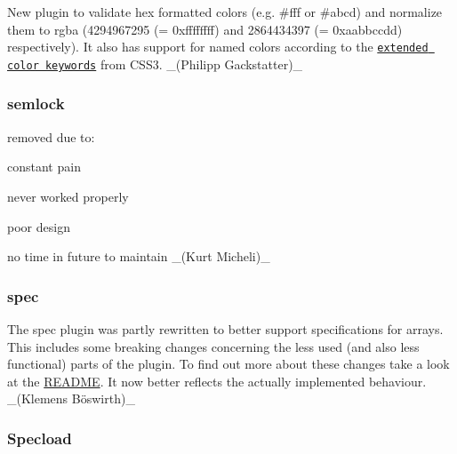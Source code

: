 \begin{DoxyItemize}
\item New plugin to validate hex formatted colors (e.\+g. \#fff or \#abcd) and normalize them to rgba (4294967295 (= 0xffffffff) and 2864434397 (= 0xaabbccdd) respectively). It also has support for named colors according to the \href{https://www.w3.org/TR/css-color-3/#svg-color}{\tt extended color keywords} from C\+S\+S3. \+\_\+(\+Philipp Gackstatter)\+\_\+
\end{DoxyItemize}

\subsubsection*{semlock}

removed due to\+:


\begin{DoxyItemize}
\item constant pain
\item never worked properly
\item poor design
\item no time in future to maintain \+\_\+(\+Kurt Micheli)\+\_\+
\end{DoxyItemize}

\subsubsection*{spec}


\begin{DoxyItemize}
\item The spec plugin was partly rewritten to better support specifications for arrays. This includes some breaking changes concerning the less used (and also less functional) parts of the plugin. To find out more about these changes take a look at the \hyperlink{md_src_plugins_spec_README_src_plugins_spec_README_md}{R\+E\+A\+D\+ME}. It now better reflects the actually implemented behaviour. \+\_\+(Klemens Böswirth)\+\_\+
\end{DoxyItemize}

\subsubsection*{Specload}


